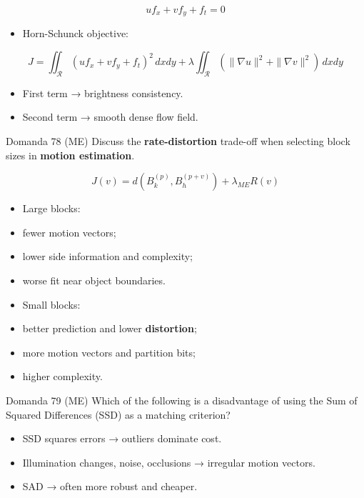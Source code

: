 $$
u f_x + v f_y + f_t = 0
$$


\begin{itemize}
  \item Horn-Schunck objective:
\end{itemize}


$$
J=
\iint_{\mathcal{R}}(u f_x+v f_y+f_t)^2\,dxdy
+\lambda\iint_{\mathcal{R}}(\|\nabla u\|^2+\|\nabla v\|^2)\,dxdy
$$


\begin{itemize}
  \item First term → brightness consistency.
  \item Second term → smooth dense flow field.
\end{itemize}



\begin{questionbox}{Domanda 78}
(ME) Discuss the \textbf{\textbf{rate}-\textbf{distortion}} trade-off when selecting block sizes in \textbf{motion estimation}.
\end{questionbox}



$$
J(v)=d(B_k^{(p)},B_h^{(p+v)})+\lambda_{ME}R(v)
$$


\begin{itemize}
  \item Large blocks:
  \item fewer motion vectors;
  \item lower side information and complexity;
  \item worse fit near object boundaries.
  \item Small blocks:
  \item better prediction and lower \textbf{distortion};
  \item more motion vectors and partition bits;
  \item higher complexity.
\end{itemize}



\begin{questionbox}{Domanda 79}
(ME) Which of the following is a disadvantage of using the Sum of Squared Differences (SSD) as a matching criterion?
\end{questionbox}


\begin{itemize}
  \item SSD squares errors → outliers dominate cost.
  \item Illumination changes, noise, occlusions → irregular motion vectors.
  \item SAD → often more robust and cheaper.
\end{itemize}



